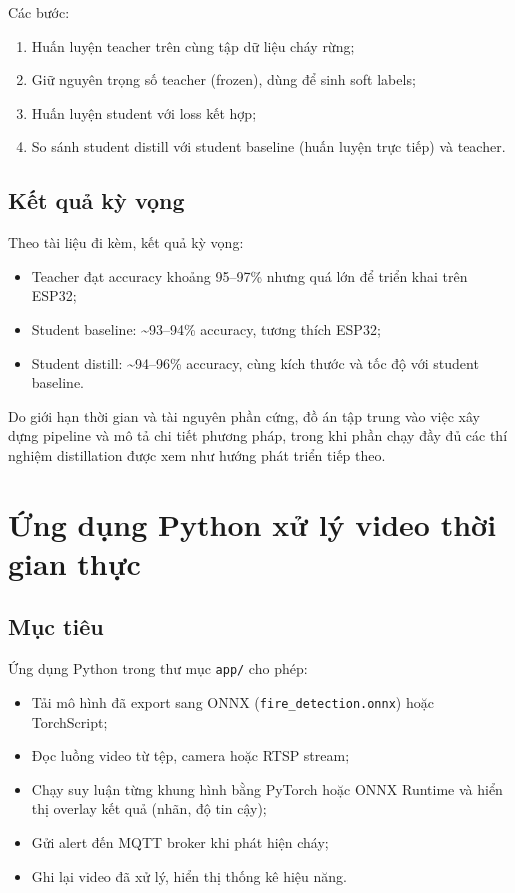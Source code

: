 \documentclass[12pt,a4paper]{report}
\begin{document}
Các bước:
\begin{enumerate}
  \item Huấn luyện teacher trên cùng tập dữ liệu cháy rừng;
  \item Giữ nguyên trọng số teacher (frozen), dùng để sinh soft labels;
  \item Huấn luyện student với loss kết hợp;
  \item So sánh student distill với student baseline (huấn luyện trực tiếp) và teacher.
\end{enumerate}

\subsection{Kết quả kỳ vọng}

Theo tài liệu đi kèm, kết quả kỳ vọng:
\begin{itemize}
  \item Teacher đạt accuracy khoảng 95--97\% nhưng quá lớn để triển khai trên ESP32;
  \item Student baseline: \textasciitilde 93--94\% accuracy, tương thích ESP32;
  \item Student distill: \textasciitilde 94--96\% accuracy, cùng kích thước và tốc độ với student baseline.
\end{itemize}

Do giới hạn thời gian và tài nguyên phần cứng, đồ án tập trung vào việc xây dựng pipeline và mô tả chi tiết phương pháp, trong khi phần chạy đầy đủ các thí nghiệm distillation được xem như hướng phát triển tiếp theo.

\section{Ứng dụng Python xử lý video thời gian thực}

\subsection{Mục tiêu}

Ứng dụng Python trong thư mục \texttt{app/} cho phép:
\begin{itemize}
  \item Tải mô hình đã export sang ONNX (\texttt{fire\_detection.onnx}) hoặc TorchScript;
  \item Đọc luồng video từ tệp, camera hoặc RTSP stream;
  \item Chạy suy luận từng khung hình bằng PyTorch hoặc ONNX Runtime và hiển thị overlay kết quả (nhãn, độ tin cậy);
  \item Gửi alert đến MQTT broker khi phát hiện cháy;
  \item Ghi lại video đã xử lý, hiển thị thống kê hiệu năng.
\end{itemize}
\end{document}
